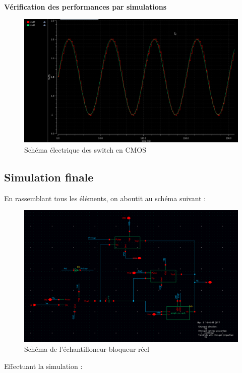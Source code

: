 \documentclass[11pt]{article}
\begin{document}
\textbf{V\'erification des performances par simulations}

\begin{figure}[!htb]
\begin{center}
  \includegraphics[width=0.8\linewidth]{switchs_simu.png}
  \caption{Sch\'ema \'electrique des switch en CMOS}
\end{center}
\end{figure}

\clearpage

\subsection{Simulation finale}
En rassemblant tous les \'el\'ements, on aboutit au sch\'ema suivant :

\begin{figure}[!htb]
\begin{center}
  \includegraphics[width=0.80\linewidth]{EB-Schematic.png}
  \caption{Sch\'ema de l'\'echantilloneur-bloqueur r\'eel}
\end{center}
\end{figure}

Effectuant la simulation :
\end{document}
